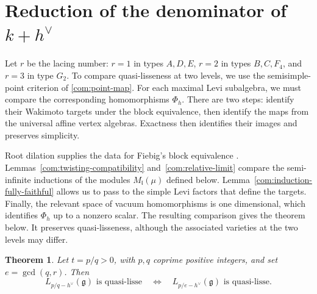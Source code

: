 \documentclass[11pt,a4paper]{amsart}
\numberwithin{equation}{section}
\newtheorem{theorem}{Theorem}[section]
\theoremstyle{definition}
\theoremstyle{remark}
\newcommand{\g}{\mathfrak g}
\newcommand{\lev}{\mathfrak l}
\begin{document}
\section{Reduction of the denominator of \texorpdfstring{$k+h^\vee$}{k+h dual}}
\label{com:transport}
Let $r$ be the lacing number: $r=1$ in types $A,D,E$,
$r=2$ in types $B,C,F_4$, and $r=3$ in type $G_2$.
To compare quasi-lisseness at two levels, we use the semisimple-point
criterion of \cref{com:point-map}. For each maximal Levi subalgebra,
we must compare the corresponding homomorphisms $\Phi_h$.
There are two steps: identify their Wakimoto targets under the block
equivalence, then identify the maps from the universal affine vertex
algebras. Exactness then identifies their images and preserves simplicity.

Root dilation supplies the data for Fiebig's block equivalence
\cite[Theorem~4.1]{Fiebig}. Lemmas~\ref{com:twisting-compatibility}
and~\ref{com:relative-limit} compare the semi-infinite inductions of the
modules $M_\lev(\mu)$ defined below.
Lemma~\ref{com:induction-fully-faithful} allows us to pass to the simple
Levi factors that define the targets. Finally, the relevant space of
vacuum homomorphisms is one dimensional, which identifies $\Phi_h$
up to a nonzero scalar. The resulting comparison gives the theorem
below. It preserves quasi-lisseness, although the associated varieties
at the two levels may differ.

\begin{theorem}\label{thm:denominator}
Let $t=p/q>0$, with $p,q$ coprime positive integers, and set
$e=\gcd(q,r)$. Then
\begin{equation}\label{com:denominator-statement}
 L_{p/q-h^\vee}(\g)\text{ is quasi-lisse}
 \quad\Longleftrightarrow\quad
 L_{p/e-h^\vee}(\g)\text{ is quasi-lisse}.
\end{equation}
\end{theorem}
\end{document}
